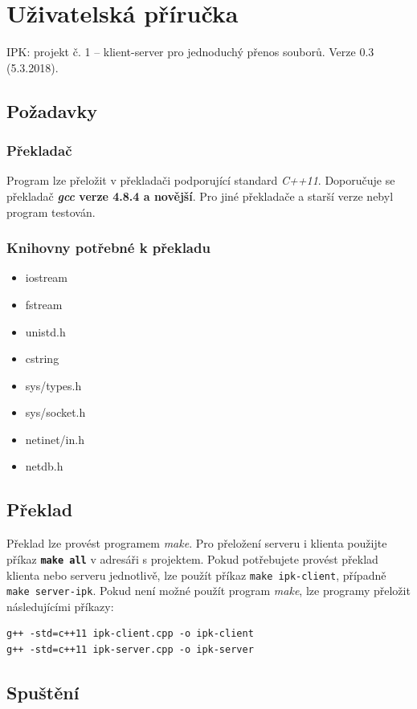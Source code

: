 \documentclass[11pt,a4paper]{article}
\begin{document}
\section{Uživatelská příručka}
IPK: projekt č. 1 -- klient-server pro jednoduchý přenos souborů. Verze 0.3 (5.3.2018).
\subsection{Požadavky}
\subsubsection*{Překladač}
Program lze přeložit v překladači podporující standard \textit{C++11}. Doporučuje se překladač \textbf{\textit{gcc} verze 4.8.4 a novější}. Pro jiné překladače a starší verze nebyl program testován.
\subsubsection*{Knihovny potřebné k překladu}
\begin{itemize}
	\item iostream
	\item fstream
	\item unistd.h
	\item cstring
	\item sys/types.h
	\item sys/socket.h
	\item netinet/in.h
	\item netdb.h
\end{itemize}

\subsection{Překlad}
Překlad lze provést programem \textit{make}. Pro přeložení serveru i klienta použijte příkaz \textbf{\texttt{make all}} v adresáři s projektem. Pokud potřebujete provést překlad klienta nebo serveru jednotlivě, lze použít příkaz \texttt{make ipk-client}, případně \texttt{make server-ipk}.
Pokud není možné použít program \textit{make}, lze programy přeložit následujícími příkazy:
\begin{lstlisting}
g++ -std=c++11 ipk-client.cpp -o ipk-client
g++ -std=c++11 ipk-server.cpp -o ipk-server
\end{lstlisting}

\subsection{Spuštění}
\end{document}
